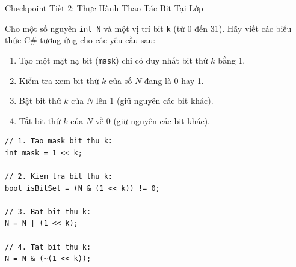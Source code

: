 \documentclass[aspectratio=169, 10pt]{beamer}
\begin{document}
\begin{frame}[fragile]{Checkpoint Tiết 2: Thực Hành Thao Tác Bit Tại Lớp}
  \begin{tcolorbox}[colback=UniLightBlue!30,colframe=UniBlue,title=\textbf{Thử thách 5 phút: Viết biểu thức Bitwise},fonttitle=\small\bfseries]
    Cho một số nguyên \texttt{int N} và một vị trí bit \texttt{k} (từ 0 đến 31). Hãy viết các biểu thức C\# tương ứng cho các yêu cầu sau:
    \begin{enumerate}\small
      \item Tạo một mặt nạ bit (\texttt{mask}) chỉ có duy nhất bit thứ $k$ bằng 1.
      \item Kiểm tra xem bit thứ $k$ của số $N$ đang là 0 hay 1.
      \item Bật bit thứ $k$ của $N$ lên 1 (giữ nguyên các bit khác).
      \item Tắt bit thứ $k$ của $N$ về 0 (giữ nguyên các bit khác).
    \end{enumerate}
  \end{tcolorbox}

  \begin{tcolorbox}[colback=UniGreen!10,colframe=UniGreen,title=\textbf{Lời giải chuẩn xác từ Giảng viên},fonttitle=\small\bfseries]
\begin{lstlisting}[numbers=none]
// 1. Tao mask bit thu k:
int mask = 1 << k;

// 2. Kiem tra bit thu k:
bool isBitSet = (N & (1 << k)) != 0;

// 3. Bat bit thu k:
N = N | (1 << k);

// 4. Tat bit thu k:
N = N & (~(1 << k));
\end{lstlisting}
  \end{tcolorbox}
\end{frame}
\end{document}
